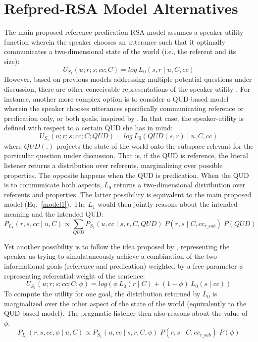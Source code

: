 \section{Refpred-RSA Model Alternatives}
The main proposed reference-predication RSA model assumes a speaker utility function wherein the speaker chooses an utterance such that it optimally communicates a two-dimensional state of the world (i.e., the referent and its size):
\begin{equation*}
U_{S_1} (u; r; s; cc; C) = log \: L_0 (s, r \mid u, C, cc) 
\end{equation*}
However, based on previous models addressing multiple potential questions under discussion, there are other conceivable representations of the speaker utility \parencite[cf.][]{kao2014nonliteral, yoon2016talking}. For instance, another more complex option is to consider a QUD-based model wherein the speaker chooses utterances specifically communicating reference or predication only, or both goals, inspired by \textcite{kao2014nonliteral}. In that case, the speaker-utility is defined with respect to a certain QUD she has in mind: 
\begin{equation*}
U_{S_1} (u; r; s; cc; C; QUD) = log \: L_0(QUD(s, r) \mid u, C, cc)
\end{equation*} 
where $QUD(.)$ projects the state of the world onto the subspace relevant for the particular question under discussion. That is, if the QUD is reference, the literal listener returns a distribution over referents, marginalizing over possible properties. The opposite happens when the QUD is predication. When the QUD is to communicate both aspects, $L_0$ returns a two-dimensional distribution over referents and properties. The latter possibility is equivalent to the main proposed model (Eq.~\ref{model1}). The $L_1$ would then jointly reasons about the intended meaning and the intended QUD: 
\begin{equation*}
P_{L_1} (r, s, cc \mid u, C) \propto \sum_{QUD} P_{S_1} (u, cc \mid s, r, C, QUD) \; P(r, s \mid C, cc_{r\_sub}) \; P(QUD)
\end{equation*} 

Yet another possibility is to follow the idea proposed by \textcite{yoon2016talking}, representing the speaker as trying to simulataneously achieve a combination of the two informational goals (reference and predication) weighted by a free parameter $\phi$ representing referential weight of the sentence:
\begin{equation*}
U_{S_1} (u; r; s; cc; C; \phi) = log(\phi \: L_0(r \mid C) + (1 - \phi) \: L_0(s \mid cc))
\end{equation*} 
To compute the utility for one goal, the distribution returned by $L_0$ is marginalized over the other aspect of the state of the world (equivalently to the QUD-based model). The pragmatic listener then also reasons about the value of $\phi$:
\begin{equation*}
P_{L_1} (r, s, cc, \phi \mid u, C) \propto P_{S_1} (u, cc \mid s, r, C, \phi) \; P(r, s \mid C, cc_{r\_sub}) \; P(\phi)
\end{equation*} 

